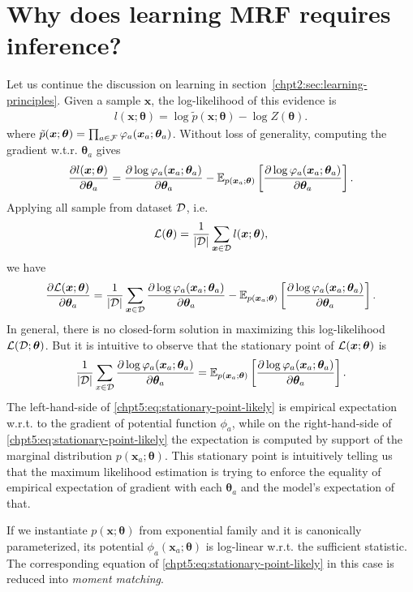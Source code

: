 \section{Why does learning MRF requires inference?}
\label{chpt5:sec:learning-mrf}
Let us continue the discussion on learning in section~\ref{chpt2:sec:learning-principles}. Given a sample $\bm{x}$, the log-likelihood of this evidence is
\begin{align}\label{chpt5:eq:one-sample-likely}
  l(\bm{x};\bm{\theta}) = \log{\tilde{p}(\bm{x}; \bm{\theta})} - \log{Z(\bm{\theta})}.
\end{align}
where $\tilde{p}(\bm{x}; \bm{\theta}) =  \prod_{a\in \mathcal{F}} \varphi_a(\bm{x}_a; \bm{\theta}_a)$. 
Without loss of generality, computing the gradient w.t.r. $\bm{\theta}_a$ gives
\begin{align}\label{chpt5:eq:one-sample-likely-grad}
  \frac{ \partial l(\bm{x};\bm{\theta})}{\partial \bm{\theta}_a} = \frac{ \partial \log{{\varphi_a}(\bm{x}_a; \bm{\theta}_a)}}{\partial \bm{\theta}_a} - \mathbb{E}_{p(\bm{x}_a; \bm{\theta})}\left[ \frac{ \partial \log{{\varphi_a}(\bm{x}_a; \bm{\theta}_a)}}{\partial \bm{\theta}_a} \right].
\end{align}
Applying all sample from dataset $\mathcal{D}$, i.e.
\begin{equation}
  \mathcal{L}(\bm{\theta}) = \frac{1}{|\mathcal{D} |} \sum_{\bm{x} \in \mathcal{D}} l(\bm{x}; \bm{\theta}),
\end{equation}
we have
\begin{equation}\label{chpt3:eq:likely-gradient-thetaa}
  \frac{ \partial \mathcal{L}(\bm{x};\bm{\theta})}{\partial \bm{\theta}_a} = \frac{1}{|\mathcal{D} |} \sum_{\bm{x} \in \mathcal{D}}\frac{ \partial \log{{\varphi_a}(\bm{x}_a; \bm{\theta}_a)}}{\partial \bm{\theta}_a} - \mathbb{E}_{p(\bm{x}_a; \bm{\theta})}\left[ \frac{ \partial \log{{\varphi_a}(\bm{x}_a; \bm{\theta}_a)}}{\partial \bm{\theta}_a} \right].
\end{equation}
In general, there is no closed-form solution in maximizing this log-likelihood $\mathcal{L}(\mathcal{D}; \bm{\theta})$. But it is intuitive to observe that the stationary point of ${\mathcal{L}(\bm{x};\bm{\theta})}$ is
\begin{equation}\label{chpt5:eq:stationary-point-likely}
  \frac{1}{|\mathcal{D} |} \sum_{x \in \mathcal{D}}\frac{ \partial \log{{\varphi_a}(\bm{x}_a; \bm{\theta}_a)}}{\partial \bm{\theta}_a} = \mathbb{E}_{p(\bm{x}_a; \bm{\theta})}\left[ \frac{ \partial \log{{\varphi_a}(\bm{x}_a; \bm{\theta}_a)}}{\partial \bm{\theta}_a} \right].
\end{equation}
The left-hand-side of \eqref{chpt5:eq:stationary-point-likely} is empirical expectation w.r.t. to the gradient of potential function $\phi_a$, while on the right-hand-side of \eqref{chpt5:eq:stationary-point-likely} the expectation is computed by support of the marginal distribution $p(\bm{x}_a; \bm{\theta})$. This stationary point is intuitively telling us that the maximum likelihood estimation is trying to enforce the equality of empirical expectation of gradient with each $\bm{\theta}_a$ and the model's expectation of that.
\begin{remark}
  If we instantiate $p(\bm{x};\bm{\theta})$ from exponential family and it is canonically parameterized, its potential $\phi_a(\bm{x}_a; \bm{\theta})$ is log-linear w.r.t. the sufficient statistic. The corresponding equation of \eqref{chpt5:eq:stationary-point-likely} in this case is reduced into \textit{moment matching}.
\end{remark}

